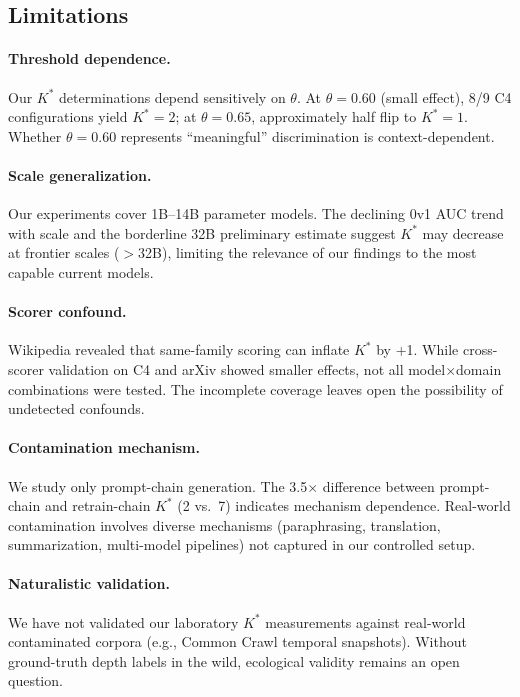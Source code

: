 \documentclass[11pt]{article}
\newcommand{\kstar}{K^*}
\newcommand{\thetaval}{\theta}
\begin{document}
\subsection{Limitations}

\paragraph{Threshold dependence.} Our $\kstar$ determinations depend sensitively on $\thetaval$. At $\thetaval{=}0.60$ (small effect), 8/9 C4 configurations yield $\kstar{=}2$; at $\thetaval{=}0.65$, approximately half flip to $\kstar{=}1$. Whether $\thetaval{=}0.60$ represents ``meaningful'' discrimination is context-dependent.

\paragraph{Scale generalization.} Our experiments cover 1B--14B parameter models. The declining 0v1 AUC trend with scale and the borderline 32B preliminary estimate suggest $\kstar$ may decrease at frontier scales ($>$32B), limiting the relevance of our findings to the most capable current models.

\paragraph{Scorer confound.} Wikipedia revealed that same-family scoring can inflate $\kstar$ by +1. While cross-scorer validation on C4 and arXiv showed smaller effects, not all model$\times$domain combinations were tested. The incomplete coverage leaves open the possibility of undetected confounds.

\paragraph{Contamination mechanism.} We study only prompt-chain generation. The 3.5$\times$ difference between prompt-chain and retrain-chain $\kstar$ (2 vs.\ 7) indicates mechanism dependence. Real-world contamination involves diverse mechanisms (paraphrasing, translation, summarization, multi-model pipelines) not captured in our controlled setup.

\paragraph{Naturalistic validation.} We have not validated our laboratory $\kstar$ measurements against real-world contaminated corpora (e.g., Common Crawl temporal snapshots). Without ground-truth depth labels in the wild, ecological validity remains an open question.
\end{document}
